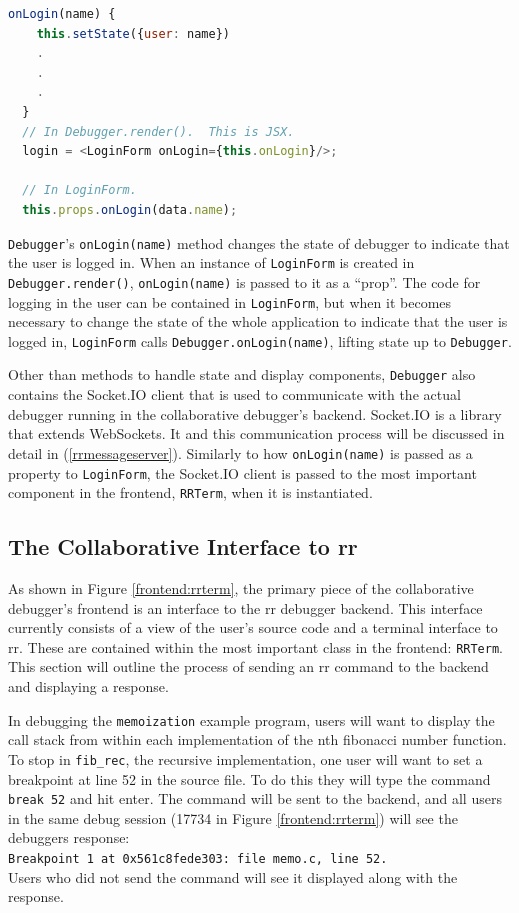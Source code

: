 \documentclass[12pt]{article}
\begin{document}
\begin{lstlisting}[language=Javascript,basicstyle=\linespread{0.5}\ttfamily,caption={Lifting State Up},captionpos=b]
  onLogin(name) {
    this.setState({user: name})
    .
    .
    .
  }
  // In Debugger.render().  This is JSX.
  login = <LoginForm onLogin={this.onLogin}/>;
  
  // In LoginForm.
  this.props.onLogin(data.name);
\end{lstlisting}

\lstinline{Debugger}'s \lstinline{onLogin(name)} method changes the
state of debugger to indicate that the user is logged in.  When an
instance of \lstinline{LoginForm} is created in
\lstinline{Debugger.render()}, \lstinline{onLogin(name)} is passed to
it as a ``prop''.  The code for logging in the user can be contained
in \lstinline{LoginForm}, but when it becomes necessary to change the
state of the whole application to indicate that the user is logged in,
\lstinline{LoginForm} calls \lstinline{Debugger.onLogin(name)},
lifting state up to \lstinline{Debugger}.
\par

Other than methods to handle state and display components,
\lstinline{Debugger} also contains the Socket.IO client that is used
to communicate with the actual debugger running in the collaborative
debugger's backend.  Socket.IO is a library that extends WebSockets.
It and this communication process will be discussed in detail in
(\ref{rrmessageserver}).  Similarly to how \lstinline{onLogin(name)}
is passed as a property to \lstinline{LoginForm}, the Socket.IO client
is passed to the most important component in the frontend,
\lstinline{RRTerm}, when it is instantiated.

\subsection{The Collaborative Interface to rr}

As shown in Figure \ref{frontend:rrterm}, the primary piece of the
collaborative debugger's frontend is an interface to the rr debugger
backend.  This interface currently consists of a view of the user's
source code and a terminal interface to rr.  These are contained
within the most important class in the frontend: \lstinline{RRTerm}.
This section will outline the process of sending an rr command to the
backend and displaying a response.
\par

In debugging the \lstinline{memoization} example program, users will
want to display the call stack from within each implementation of the
nth fibonacci number function.  To stop in \lstinline{fib_rec}, the
recursive implementation, one user will want to set a breakpoint at
line 52 in the source file.  To do this they will type the command
\lstinline{break 52} and hit enter.  The command will be sent to the
backend, and all users in the same debug session (17734 in Figure
\ref{frontend:rrterm}) will see the debuggers response:\\
\lstinline{Breakpoint 1 at 0x561c8fede303: file memo.c, line 52.}\\
Users who did not send the command will see it displayed along with
the response.
\end{document}
